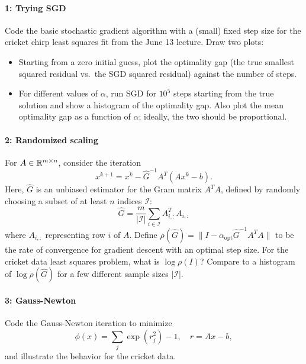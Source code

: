 \documentclass[12pt, leqno]{article} %
\begin{document}

\paragraph*{1: Trying SGD}
Code the basic stochastic gradient algorithm with a (small) fixed step
size for the cricket chirp least squares fit from the June 13 lecture.
Draw two plots:
\begin{itemize}
\item Starting from a zero initial guess, plot the optimality gap (the
  true smallest squared residual vs.~the SGD squared residual)
  against the number of steps.
\item For different values of $\alpha$, run SGD for $10^5$ steps
  starting from the true solution and show a histogram of the
  optimality gap.  Also plot the mean optimality gap as a function of
  $\alpha$; ideally, the two should be proportional.
\end{itemize}

\paragraph*{2: Randomized scaling}
For $A \in \mathbb{R}^{m \times n}$, consider the iteration
\[
  x^{k+1} = x^k - \hat{G}^{-1} A^T (Ax^k - b).
\]
Here, $\hat{G}$ is an unbiased estimator for the Gram matrix $A^T A$,
defined by randomly choosing a subset of at least $n$ indices
$\mathcal{I}$:
\[
  \hat{G} =
  \frac{m}{|\mathcal{I}|} \sum_{i \in \mathcal{I}} A_{i,:}^T A_{i,:}
\]
where $A_{i,:}$ representing row $i$ of $A$.  Define
$\rho(\hat{G}) = \|I-\alpha_{\mathrm{opt}} \hat{G}^{-1} A^T A\|$ to be
the rate of convergence for gradient descent with an optimal
step size.  For the cricket data least squares problem,
what is $\log \rho(I)$?  Compare to a histogram of
$\log \rho(\hat{G})$ for a few different sample sizes $|\mathcal{I}|$.

\paragraph*{3: Gauss-Newton}
Code the Gauss-Newton iteration to minimize
\[
  \phi(x) = \sum_j \exp(r_j^2)-1, \quad r = Ax-b,
\]
and illustrate the behavior for the cricket data.
\end{document}
